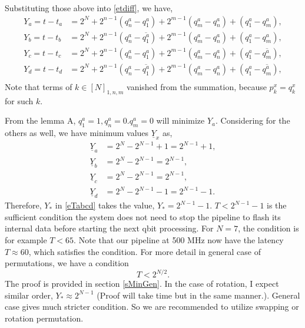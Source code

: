 \documentclass[a4paper]{article}
\newcommand{\eqlabel}[1]{\label{#1}}
\newcommand{\br}[1]{\left(#1\right)}
\renewcommand{\bar}{\overline}
\newcommand{\ubar}{\underline}
\begin{document}
Substituting those above into \eqref{etdiff}, we have,
\begin{align*}
 Y_a = t - t_a  &= 2^N + 2^{n-1}\br{q^a_n - q^a_1} + 2^{m-1}\br{q^a_m - q^a_n} + (q^a_1 - q^a_m), \\
 Y_b = t - t_b  &= 2^N + 2^{n-1}\br{q^a_n - \bar{q^a_1}} + 2^{m-1}\br{q^a_m - q^a_n} + (q^a_1 - q^a_m), \\
 Y_c = t - t_c  &= 2^N + 2^{n-1}\br{q^a_n - q^a_1} + 2^{m-1}\br{q^a_m - q^a_n} + (q^a_1 -\bar{q^a_m}), \\
 Y_d = t - t_d  &= 2^N + 2^{n-1}\br{q^a_n - \bar{q^a_1}} + 2^{m-1}\br{q^a_m - q^a_n} + (q^a_1 -\bar{q^a_m}), \\
\end{align*}
Note that terms of \(k\in[N]_{1, n, m}\) vanished from the summation, because \(p^x_k = q^x_k\) for such \(k\).

From the lemma A, \(q_1^a = 1, q_n^a =0. q_m^a = 0\) will minimize \(Y_a\). Considering for the others as well, we have minimum values \(\ubar{Y}_x\) as,
\begin{align*}
\ubar{Y}_a &= 2^{N}- 2^{N-1} + 1 = 2^{N-1} + 1, \\
\ubar{Y}_b &= 2^N - 2^{N-1} = 2^{N-1},\\ 
\ubar{Y}_c &= 2^{N} - 2^{N-1} = 2^{N-1},\\
\ubar{Y}_d &= 2^N - 2^{N-1} - 1 = 2^{N-1} -1.
\end{align*}
Therefore, \(Y_*\) in \eqref{eTabcd} takes the value, \(Y_* = 2^{N-1} -1\). \(T < 2^{N-1} -1\) is the sufficient condition the system does not need to stop the pipeline to flash its internal data before starting the next qbit processing. For \(N=7\), the condition is for example \(T < 65\). Note that our pipeline at 500 MHz now have the latency \(T \approx 60\), which satisfies the condition. For more detail in general case of permutations, we have a condition 
\begin{equation}
    \eqlabel{eTinGen}
    T < 2^{N/2}.
\end{equation}
The proof is provided in section \ref{sMinGen}. In the case of rotation, I expect similar order, \(Y_* \approx 2^{N-1}\) (Proof will take time but in the same manner.). General case gives much stricter condition. So we are recommended to utilize swapping or rotation permutation.
\end{document}

